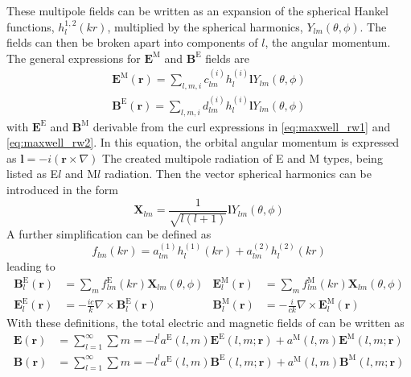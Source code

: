These multipole fields can be written as an expansion of the spherical Hankel functions, $h_l^{1,2}(kr)$, multiplied by the spherical harmonics, $Y_{lm}(\theta,\phi)$. The fields can then be broken apart into components of $l$, the angular momentum.  The general expressions for $\textbf{E}^\text{M}$ and $\textbf{B}^\text{E}$ fields are
\begin{subequations}
\begin{align}
    \textbf{E}^\text{M}(\textbf{r})=\sum_{l,m,i}c_{lm}^{(i)}h_l^{(i)}\textbf{l}Y_{lm}(\theta,\phi) \\
    \textbf{B}^\text{E}(\textbf{r})=\sum_{l,m,i}d_{lm}^{(i)}h_l^{(i)}\textbf{l}Y_{lm}(\theta,\phi)
\end{align}
\end{subequations}
with $\textbf{E}^\text{E}$ and $\textbf{B}^\text{M}$ derivable from the curl expressions in \ref{eq:maxwell_rw1} and \ref{eq:maxwell_rw2}. In this equation, the orbital angular momentum is expressed as $\textbf{l}=-i(\textbf{r}\times\nabla)$ The created multipole radiation of E and M types, being listed as E$l$ and M$l$ radiation. Then the vector spherical harmonics can be introduced in the form
\begin{equation}
    \textbf{X}_{lm}=\frac{1}{\sqrt{l(l+1)}}\textbf{l}Y_{lm}(\theta,\phi)
\end{equation}
A further simplification can be defined as
\begin{equation}
    f_{lm}(kr)=a_{lm}^{(1)}h_l^{(1)}(kr)+a_{lm}^{(2)}h_l^{(2)}(kr)
\end{equation}
leading to
\begin{subequations}
\begin{align}
    \textbf{B}_l^\text{E}(\textbf{r}) & = \sum_m f_{lm}^{\text{E}}(kr)\textbf{X}_{lm}(\theta,\phi) & \textbf{E}_l^\text{M}(\textbf{r}) & = \sum_m f_{lm}^{\text{M}}(kr)\textbf{X}_{lm}(\theta,\phi)\\
    \textbf{E}_l^\text{E}(\textbf{r}) & = -\frac{ic}{k}\nabla\times \textbf{B}_l^\text{E}(\textbf{r}) & \textbf{B}_l^\text{M}(\textbf{r}) & = -\frac{i}{ck}\nabla\times \textbf{E}_l^\text{M}(\textbf{r})
\end{align}
\end{subequations}
With these definitions, the total electric and magnetic fields of can be written as
\begin{subequations}
\begin{align}
    \textbf{E}(\textbf{r}) & = \sum_{l=1}^{\infty}\sum{m=-l}^{l} a^\text{E}(l,m)\textbf{E}^\text{E}(l,m;\textbf{r})+ a^\text{M}(l,m)\textbf{E}^\text{M}(l,m;\textbf{r}) \\
    \textbf{B}(\textbf{r}) & = \sum_{l=1}^{\infty}\sum{m=-l}^{l} a^\text{E}(l,m)\textbf{B}^\text{E}(l,m;\textbf{r})+ a^\text{M}(l,m)\textbf{B}^\text{M}(l,m;\textbf{r}) 
\end{align}
\end{subequations}
